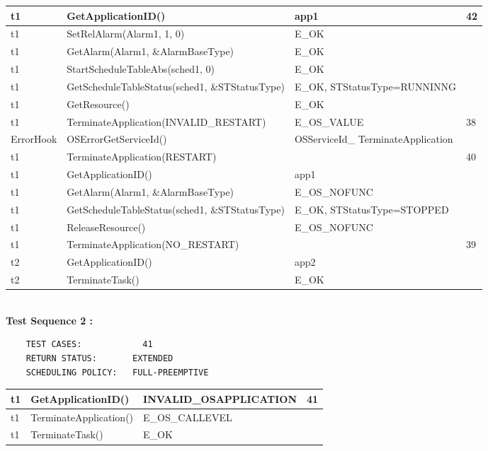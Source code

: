 \documentclass[10pt]{article}
\newlength{\Li}\settowidth{\Li}{Running}
\newlength{\Lii}\setlength{\Lii}{7cm}
\newlength{\Liiii}\setlength{\Liiii}{0.9cm}
\newlength{\Liii}\setlength{\Liii}{\textwidth} \addtolength{\Liii}{-\Li} \addtolength{\Liii}{-\Lii} \addtolength{\Liii}{-\Liiii}
\begin{document}
	\begin{supertabular}{|p{\Li}|p{\Lii}|p{\Liii}|p{\Liiii}|} \hline
	t1		& GetApplicationID()									& app1								& 42 \\ \hline
	t1		& SetRelAlarm(Alarm1, 1, 0)							& E\_OK								& \\ \hline
	t1		& GetAlarm(Alarm1, \&AlarmBaseType)					& E\_OK								& \\ \hline
	t1		& StartScheduleTableAbs(sched1, 0)					& E\_OK								& \\ \hline
	t1		& GetScheduleTableStatus(sched1, \&STStatusType)		& E\_OK, STStatusType=RUNNINNG		& \\ \hline
	t1		& GetResource()									& E\_OK								& \\ \hline
	t1		& TerminateApplication(INVALID\_RESTART)				& E\_OS\_VALUE						& 38 \\ \hline
	ErrorHook	& OSErrorGetServiceId()								& OSServiceId\_ TerminateApplication		& \\ \hline
	t1		& TerminateApplication(RESTART)						& 									& 40 \\ \hline
	
	t1		& GetApplicationID()									& app1								& \\ \hline
	t1		& GetAlarm(Alarm1, \&AlarmBaseType)					& E\_OS\_NOFUNC						& \\ \hline
	t1		& GetScheduleTableStatus(sched1, \&STStatusType)		& E\_OK, STStatusType=STOPPED			& \\ \hline
	t1		& ReleaseResource()								& E\_OS\_NOFUNC						& \\ \hline
	t1		& TerminateApplication(NO\_RESTART)					& 									& 39 \\ \hline
	
	t2		& GetApplicationID()									& app2								& \\ \hline
	t2		& TerminateTask()									& E\_OK								& \\ \hline
	\end{supertabular}\\
	
	\textbf{Test Sequence 2 :}
	\begin{lstlisting}
	TEST CASES:		       41
	RETURN STATUS:	  	 EXTENDED
	SCHEDULING POLICY:   FULL-PREEMPTIVE
	\end{lstlisting}
	
	
	\begin{supertabular}{|p{\Li}|p{\Lii}|p{\Liii}|p{\Liiii}|} \hline 
	t1		& GetApplicationID()									& INVALID\_OSAPPLICATION								& 41 \\ \hline
	t1		& TerminateApplication()								& E\_OS\_CALLEVEL									& \\ \hline
	t1 		& TerminateTask()									& E\_OK												& \\ \hline 
	\end{supertabular}\\
	
\end{document}
